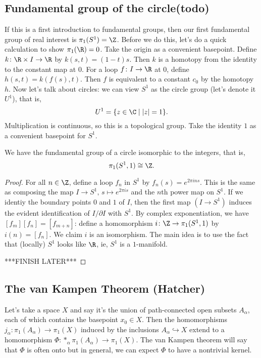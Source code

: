 \subsection{Fundamental group of the circle(todo)}
If this is a first introduction to fundamental groups, then our first fundamental group of real interest is $\pi_1(S^{1} )=\Z$. Before we do this, let's do a quick calculation to show $\pi_1(\R)=0$. Take the origin as a convenient basepoint. Define $k \colon \R\times I \to \R$ by $k(s,t)=(1-t)s$. Then $k$ is a homotopy from the identity to the constant map at $0$. For a loop $f \colon I \to \R$ at $0$, define $h(s,t)=k(f(s),t).$ Then $f$ is equivalent to a constant $c_0$ by the homotopy $h$.
\orbreak
Now let's talk about circles: we can view $S^{1} $ as the circle group (let's denote it $U^1$), that is, \[
U^1 = \{z\in \C\mid |z|=1\}.
\] Multiplication is continuous, so this is a topological group. Take the identity $1$ as a convenient basepoint for  $S^{1} $.
\begin{theorem}
    We have the fundamental group of a circle isomorphic to the integers, that is, \[
        \pi_1(S^{1} ,1)\cong\Z.
    \] 
\end{theorem}
\begin{proof}
    For all $n\in \Z$, define a loop $f_n$ in $S^{1} $ by $f_n(s)=e^{2\pi i ns}$. This is the same as composing the map $I\to S^{1},\, s\mapsto e^{2\pi is}$ and the $n$th power map on $S^{1} $. If we identiy the boundary points $0$ and $1$ of $I$, then the first map $(I \to S^{1} )$ induces the evident identification of $I / \partial I$ with $S^{1} $. By complex exponentiation, we have $[f_m][f_n]=[f_{m+n}]$: define a homomorphism $i \colon \Z \to \pi_1(S^{1} ,1)$ by $i(n)=[f_n]$. We claim $i$ is an isomorphism. The main idea is to use the fact that (locally) $S^{1} $ looks like $\R$, ie, $S^{1} $ is a $1$-manifold.

    ***FINISH LATER***
\end{proof}


\subsection{The van Kampen Theorem (Hatcher)}
Let's take a space $X$ and say it's the union of path-connected open subsets $A_{\alpha}$, each of which contains the basepoint $x_0\in X$. Then the homomorphisms $j_{\alpha} \colon \pi_1(A_{\alpha}) \to \pi_1(X)$ induced by the inclusions $A_{\alpha}\hookrightarrow X$ extend to a homomorphism $\Phi \colon *_{\alpha}\pi_1(A_{\alpha}) \to \pi_1(X)$. The van Kampen theorem will say that $\Phi$ is often onto but in general, we can expect $\Phi$ to have a nontrivial kernel. 

